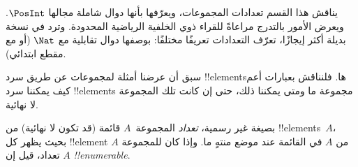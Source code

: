 \documentclass[../../../include/open-logic-section]{subfiles}
\begin{document}


\begin{editorial}
  يناقش هذا القسم تعدادات المجموعات، ويعرّفها بأنها دوال شاملة
  مجالها $\PosInt$. ويعرض الأمور بالتدرج مراعاةً للقراء ذوي الخلفية
  الرياضية المحدودة. وترد في  نسخة بديلة أكثر إيجازًا،
  تعرّف التعدادات تعريفًا مختلفًا: بوصفها دوال تقابلية مع $\Nat$
  (أو مع مقطع ابتدائي).
\end{editorial}

\begin{explain}
سبق أن عرضنا أمثلة لمجموعات عن طريق سرد !!{element}sها. فلنناقش
بعبارات أعم كيف يمكننا سرد !!{element}s مجموعة ما ومتى يمكننا ذلك،
حتى إن كانت تلك المجموعة لا نهائية.
\end{explain}

\begin{defn}
بصيغة غير رسمية، \emph{تعداد} المجموعة~$A$ قائمة (قد تكون لا
نهائية) من !!{element}s~$A$، بحيث يظهر كل !!{element} من $A$
في القائمة عند موضع منتهٍ ما. وإذا كان للمجموعة $A$ تعداد، قيل إن
$A$ \emph{!!{enumerable}}.
\end{defn}
\end{document}
